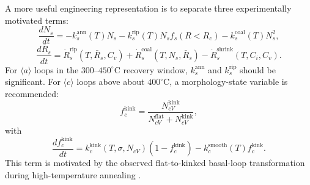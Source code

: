 \documentclass[11pt]{article}
\newcommand{\degreeC}{^\circ\mathrm{C}}
\begin{document}
A more useful engineering representation is to separate three experimentally motivated terms:
\begin{equation}
  \frac{dN_s}{dt}= -k_s^{\mathrm{ann}}(T)N_s - k_s^{\mathrm{rip}}(T)N_s f_s(R<R_c) - k_s^{\mathrm{coal}}(T)N_s^2,
\end{equation}
\begin{equation}
  \frac{d\bar R_s}{dt}= \dot R_s^{\mathrm{rip}}(T,\bar R_s,C_v)+\dot R_s^{\mathrm{coal}}(T,N_s,\bar R_s)-\dot R_s^{\mathrm{shrink}}(T,C_i,C_v).
\end{equation}
For $\langle a\rangle$ loops in the $300$--$450\degreeC$ recovery window, $k_s^{\mathrm{ann}}$ and $k_s^{\mathrm{rip}}$ should be significant.  For $\langle c\rangle$ loops above about $400\degreeC$, a morphology-state variable is recommended:
\begin{equation}
  f_{c}^{\mathrm{kink}}=\frac{N_{cV}^{\mathrm{kink}}}{N_{cV}^{\mathrm{flat}}+N_{cV}^{\mathrm{kink}}},
\end{equation}
with
\begin{equation}
  \frac{df_c^{\mathrm{kink}}}{dt}=k_{c}^{\mathrm{kink}}(T,\sigma,N_{cV})\left(1-f_c^{\mathrm{kink}}\right)-k_c^{\mathrm{smooth}}(T)f_c^{\mathrm{kink}}.
\end{equation}
This term is motivated by the observed flat-to-kinked basal-loop transformation during high-temperature annealing \citep{Liu2025}.
\end{document}
